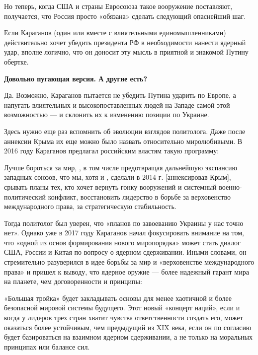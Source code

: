 Но теперь, когда США и страны Евросоюза такое вооружение поставляют, получается, что Россия просто «обязана» сделать следующий опаснейший шаг.

Если Караганов (один или вместе с влиятельными единомышленниками) действительно хочет убедить президента РФ в необходимости нанести ядерный удар, вполне логично, что он доносит эту мысль в приятной и знакомой Путину обертке.

\textbf{Довольно пугающая версия. А другие есть?}

Да. Возможно, Караганов пытается не убедить Путина ударить по Европе, а напугать влиятельных и высокопоставленных людей на Западе самой этой возможностью --- и склонить их к изменению позиции по Украине.

Здесь нужно еще раз вспомнить об эволюции взглядов политолога. Даже после аннексии Крыма их еще можно было назвать относительно миролюбивыми. В 2016 году Караганов предлагал российским властям такую программу:

\begin{fancyquotes}
    Лучше бороться за мир, , в том числе предотвращая дальнейшую экспансию западных союзов, что мы, хотя и , сделали в 2014 г. [аннексировав Крым], срывать планы тех, кто хочет вернуть гонку вооружений и системный военно-политический конфликт, восстановить лидерство в борьбе за верховенство международного права, за стратегическую стабильность.
\end{fancyquotes}

Тогда политолог был уверен, что «планов по завоеванию Украины у нас точно нет». Однако уже в 2017 году Караганов начал фокусировать внимание на том, что «одной из основ формирования нового миропорядка» может стать диалог США, России и Китая по вопросу о ядерном сдерживании. Иными словами, он стремительно разуверился в идее борьбы за мир и «верховенстве международного права» и пришел к выводу, что ядерное оружие — более надежный гарант мира на планете, чем договоренности и принципы:

\begin{fancyquotes}
    «Большая тройка» будет закладывать основы для менее хаотичной и более безопасной мировой системы будущего. Этот новый «концерт наций», если и когда у лидеров трех стран хватит чувства ответственности создать его, может оказаться более устойчивым, чем предыдущий из XIX века, если он по согласию будет базироваться на взаимном ядерном сдерживании, а не только на моральных принципах или балансе сил.
\end{fancyquotes}

